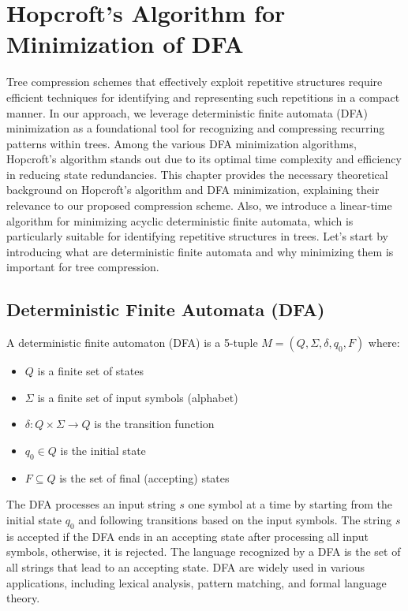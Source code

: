 \chapter{Hopcroft's Algorithm for Minimization of DFA} \label{chp:hopcroft}
Tree compression schemes that effectively exploit repetitive structures require efficient techniques for identifying and representing such repetitions in a compact manner. In our approach, we leverage deterministic finite automata (DFA) minimization as a foundational tool for recognizing and compressing recurring patterns within trees. Among the various DFA minimization algorithms, Hopcroft's algorithm stands out due to its optimal time complexity and efficiency in reducing state redundancies. This chapter provides the necessary theoretical background on Hopcroft's algorithm and DFA minimization, explaining their relevance to our proposed compression scheme. Also, we introduce a linear-time algorithm for minimizing acyclic deterministic finite automata, which is particularly suitable for identifying repetitive structures in trees. Let's start by introducing what are deterministic finite automata and why minimizing them is important for tree compression.

\section{Deterministic Finite Automata (DFA)}
\begin{definition} \label{def:dfa}
    A deterministic finite automaton (DFA) is a 5-tuple $M = (Q, \Sigma, \delta, q_0, F)$ where:
    \begin{itemize}
        \item $Q$ is a finite set of states
        \item $\Sigma$ is a finite set of input symbols (alphabet)
        \item $\delta: Q \times \Sigma \rightarrow Q$ is the transition function
        \item $q_0 \in Q$ is the initial state
        \item $F \subseteq Q$ is the set of final (accepting) states
    \end{itemize}
\end{definition}

The DFA processes an input string $s$ one symbol at a time by starting from the initial state $q_0$ and following transitions based on the input symbols. The string $s$ is accepted if the DFA ends in an accepting state after processing all input symbols, otherwise, it is rejected. The language recognized by a DFA is the set of all strings that lead to an accepting state. DFA are widely used in various applications, including lexical analysis, pattern matching, and formal language theory. 

